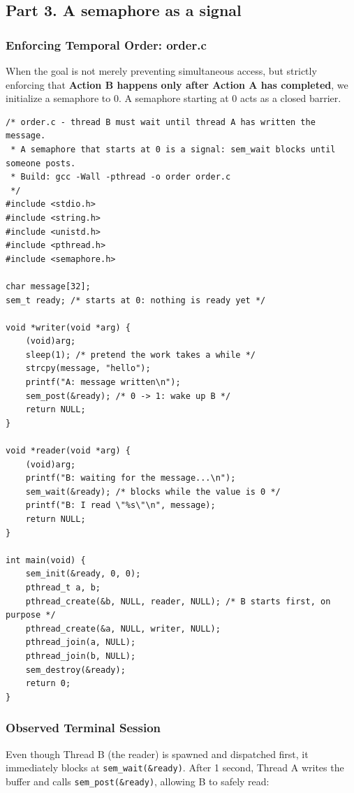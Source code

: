 \documentclass{labreport}
\begin{document}
\subsection{Part 3. A semaphore as a signal}

\subsubsection{Enforcing Temporal Order: order.c}
When the goal is not merely preventing simultaneous access, but strictly enforcing that \textbf{Action B happens only after Action A has completed}, we initialize a semaphore to $0$. A semaphore starting at $0$ acts as a closed barrier.

\begin{lstlisting}[style=c]
/* order.c - thread B must wait until thread A has written the message.
 * A semaphore that starts at 0 is a signal: sem_wait blocks until someone posts.
 * Build: gcc -Wall -pthread -o order order.c
 */
#include <stdio.h>
#include <string.h>
#include <unistd.h>
#include <pthread.h>
#include <semaphore.h>

char message[32];
sem_t ready; /* starts at 0: nothing is ready yet */

void *writer(void *arg) {
    (void)arg;
    sleep(1); /* pretend the work takes a while */
    strcpy(message, "hello");
    printf("A: message written\n");
    sem_post(&ready); /* 0 -> 1: wake up B */
    return NULL;
}

void *reader(void *arg) {
    (void)arg;
    printf("B: waiting for the message...\n");
    sem_wait(&ready); /* blocks while the value is 0 */
    printf("B: I read \"%s\"\n", message);
    return NULL;
}

int main(void) {
    sem_init(&ready, 0, 0);
    pthread_t a, b;
    pthread_create(&b, NULL, reader, NULL); /* B starts first, on purpose */
    pthread_create(&a, NULL, writer, NULL);
    pthread_join(a, NULL);
    pthread_join(b, NULL);
    sem_destroy(&ready);
    return 0;
}
\end{lstlisting}

\subsubsection{Observed Terminal Session}
Even though Thread B (the reader) is spawned and dispatched first, it immediately blocks at \texttt{sem\_wait(\&ready)}. After 1 second, Thread A writes the buffer and calls \texttt{sem\_post(\&ready)}, allowing B to safely read:
\end{document}
